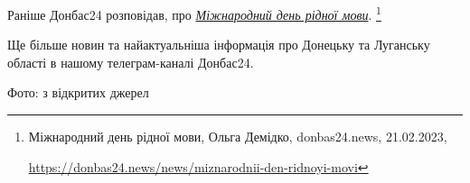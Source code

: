 Раніше Донбас24 розповідав, про \href{https://donbas24.news/news/miznarodnii-den-ridnoyi-movi}{\emph{Міжнародний день рідної мови}}.%
\footnote{Міжнародний день рідної мови, Ольга Демідко, donbas24.news, 21.02.2023, \par\url{https://donbas24.news/news/miznarodnii-den-ridnoyi-movi}}

Ще більше новин та найактуальніша інформація про Донецьку та Луганську області
в нашому телеграм-каналі Донбас24.

Фото: з відкритих джерел

